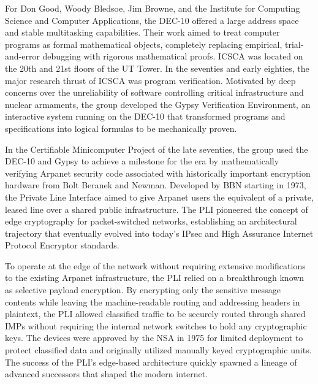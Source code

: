 For Don Good, Woody Bledsoe, Jim Browne, and the Institute for Computing Science and Computer Applications, the DEC-10 offered a large address space and stable multitasking capabilities. Their work aimed to treat computer programs as formal mathematical objects, completely replacing empirical, trial-and-error debugging with rigorous mathematical proofs. ICSCA was located on the 20th and 21st floors of the UT Tower. In the seventies and early eighties, the major research thrust of ICSCA was program verification. Motivated by deep concerns over the unreliability of software controlling critical infrastructure and nuclear armaments, the group developed the Gypsy Verification Environment, an interactive system running on the DEC-10 that transformed programs and specifications into logical formulas to be mechanically proven. 

In the Certifiable Minicomputer Project of the late seventies, the group used the DEC-10 and Gypsy to achieve a milestone for the era by mathematically verifying Arpanet security code associated with historically important encryption hardware from Bolt Beranek and Newman. Developed by BBN starting in 1973, the Private Line Interface aimed to give Arpanet users the equivalent of a private, leased line over a shared public infrastructure. The PLI pioneered the concept of edge cryptography for packet-switched networks, establishing an architectural trajectory that eventually evolved into today's IPsec and High Assurance Internet Protocol Encryptor standards. 

To operate at the edge of the network without requiring extensive modifications to the existing Arpanet infrastructure, the PLI relied on a breakthrough known as selective payload encryption. By encrypting only the sensitive message contents while leaving the machine-readable routing and addressing headers in plaintext, the PLI allowed classified traffic to be securely routed through shared IMPs without requiring the internal network switches to hold any cryptographic keys. The devices were approved by the NSA in 1975 for limited deployment to protect classified data and originally utilized manually keyed cryptographic units. The success of the PLI's edge-based architecture quickly spawned a lineage of advanced successors that shaped the modern internet. 

